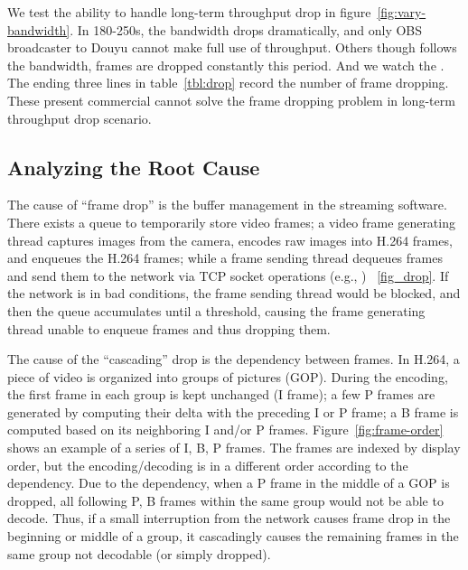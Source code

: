 We test the ability to handle long-term throughput drop in figure~\ref{fig:vary-bandwidth}. In 180-250s, the bandwidth drops dramatically, and only OBS broadcaster to Douyu cannot make full use of throughput. Others though follows the bandwidth, frames are dropped constantly this period. And we watch the . The ending three lines in table~\ref{tbl:drop} record the number of frame dropping. These present commercial cannot solve the frame dropping problem in long-term throughput drop scenario.

\subsection{Analyzing the Root Cause}


The cause of ``frame drop'' is the buffer management in the streaming software. There exists a queue to temporarily store video frames; a video frame generating thread captures images from the camera, encodes raw images into H.264 frames, and enqueues the H.264 frames; while a frame sending thread dequeues frames and send them to the network via TCP socket operations (e.g., \mywrite) ~\ref{fig_drop}.
If the network is in bad conditions, the frame sending thread would be blocked, and then the queue accumulates until a threshold, causing the frame generating thread unable to enqueue frames and thus dropping them.



The cause of the ``cascading'' drop is the dependency between frames. In H.264, a piece of video is organized into groups of pictures (GOP). During the encoding, the first frame in each group is kept unchanged (I frame); a few P frames are generated by computing their delta with the preceding I or P frame; a B frame is computed based on its neighboring I and/or P frames. Figure~\ref{fig:frame-order} shows an example of a series of I, B, P frames. The frames are indexed by display order, but the encoding/decoding is in a different order according to the dependency. Due to the dependency, when a P frame in the middle of a GOP is dropped, all following P, B frames within the same group would not be able to decode. Thus, if a small interruption from the network causes frame drop in the beginning or middle of a group, it cascadingly causes the remaining frames in the same group not decodable (or simply dropped).

